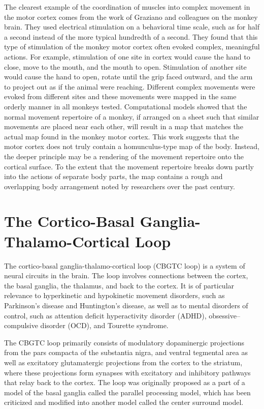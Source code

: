 \documentclass[]{book}
\begin{document}
The clearest example of the coordination of muscles into complex movement in the motor cortex comes from the work of Graziano and colleagues on the monkey brain. They used electrical stimulation on a behavioral time scale, such as for half a second instead of the more typical hundredth of a second. They found that this type of stimulation of the monkey motor cortex often evoked complex, meaningful actions. For example, stimulation of one site in cortex would cause the hand to close, move to the mouth, and the mouth to open. Stimulation of another site would cause the hand to open, rotate until the grip faced outward, and the arm to project out as if the animal were reaching. Different complex movements were evoked from different sites and these movements were mapped in the same orderly manner in all monkeys tested. Computational models showed that the normal movement repertoire of a monkey, if arranged on a sheet such that similar movements are placed near each other, will result in a map that matches the actual map found in the monkey motor cortex. This work suggests that the motor cortex does not truly contain a homunculus-type map of the body. Instead, the deeper principle may be a rendering of the movement repertoire onto the cortical surface. To the extent that the movement repertoire breaks down partly into the actions of separate body parts, the map contains a rough and overlapping body arrangement noted by researchers over the past century.

\hypertarget{the-cortico-basal-ganglia-thalamo-cortical-loop}{%
\section{The Cortico-Basal Ganglia-Thalamo-Cortical Loop}\label{the-cortico-basal-ganglia-thalamo-cortical-loop}}

The cortico-basal ganglia-thalamo-cortical loop (CBGTC loop) is a system of neural circuits in the brain. The loop involves connections between the cortex, the basal ganglia, the thalamus, and back to the cortex. It is of particular relevance to hyperkinetic and hypokinetic movement disorders, such as Parkinson's disease and Huntington's disease, as well as to mental disorders of control, such as attention deficit hyperactivity disorder (ADHD), obsessive--compulsive disorder (OCD), and Tourette syndrome.

The CBGTC loop primarily consists of modulatory dopaminergic projections from the pars compacta of the substantia nigra, and ventral tegmental area as well as excitatory glutamatergic projections from the cortex to the striatum, where these projections form synapses with excitatory and inhibitory pathways that relay back to the cortex. The loop was originally proposed as a part of a model of the basal ganglia called the parallel processing model, which has been criticized and modified into another model called the center surround model.
\end{document}
